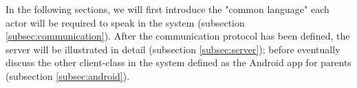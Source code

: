 \medskip
In the following sections, we will first introduce the "common language" each actor will be required to speak in the system (subsection \ref{subsec:communication}). After the communication protocol has been defined, the server will be illustrated in detail (subsection \ref{subsec:server}); before eventually discuss the other client-class in the system defined as the Android app for parents (subsection \ref{subsec:android}).